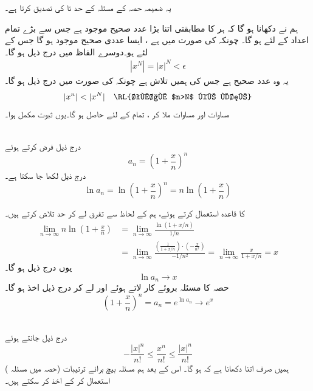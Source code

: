 یہ ضمیمہ  حصہ   کے مسئلہ    کے حد   تا  کی تصدیق کرتا ہے۔

\quad {}\quad 
ہم نے دکھانا ہو گا کہ   ہر  کا   مطابقتی    اتنا بڑا عدد صحیح  موجود ہے  جس سے بڑے تمام  اعداد  کے لئے  ہو گا۔ چونکہ   کی صورت میں  ہے ، ایسا عددی صحیح موجود ہو گا جس کے لئے  ہو۔دوسرے الفاظ میں درج ذیل ہو گا۔
\begin{align}\label{مساوات_ضمیمہ_ج_ایک}
|x^N|=|x|^N<\epsilon
\end{align}
یہ وہ عدد صحیح ہے جس کی ہمیں تلاش ہے چونکہ  کی صورت میں درج ذیل ہو گا۔
\begin{align}\label{مساوات_ضمیمہ_ج_دو}
|x^n|<|x^N|\quad \text{\RL{تمام $n>N$ کے لئے}}
\end{align}
مساوات  اور مساوات  ملا کر ، تمام  کے 
لئے    حاصل ہو گا۔یوں ثبوت مکمل ہوا۔

 \quad
  \\
 درج ذیل فرض کرتے ہوئے
\[a_n=\left(1+\frac{x}{n}\right)^n\]
درج ذیل لکھا جا سکتا ہے۔
\[\ln a_n=\ln \left(1+\frac{x}{n}\right)^n=n\ln\left(1+\frac{x}{n}\right)\]

  کا قاعدہ  استعمال کرتے ہوئے،  ہم  کے لحاظ سے تفرق لے کر حد تلاش کرتے ہیں۔
\begin{align*}
\lim_{n\to\infty} n\ln \left(1+\frac{x}{n}\right) &=\lim_{n\to\infty}\frac{\ln (1+x\!/\!n)}{1\!/\!n}\\
&=\lim_{n\to\infty}\frac{\left(\frac{1}{1+x\!/\!n}\right)\cdot\left(-\frac{x}{n^2}\right)}{-1\!/\!n^2}=\lim_{n\to\infty}\frac{x}{1+x\!/\!n}=x
\end{align*}
یوں درج ذیل ہو گا۔
\[\ln a_n\to x\]
حصہ  کا مسئلہ  بروئے کار لاتے ہوئے اور  لے کر درج ذیل اخذ ہو گا۔
\[\left(1+\frac{x}{n}\right)^n=a_n=e^{\ln a_n}\to e^x\]

\\
درج ذیل جانتے ہوئے
\[-\frac{|x|^n}{n!}\le \frac{x^n}{n!}\le \frac{|x|^n}{n!}\]
ہمیں صرف اتنا دکھانا ہے کہ  ہو گا۔ اس کے بعد ہم   مسئلہ بیچ برائے  ترتیبات    (حصہ  میں    مسئلہ  )  استعمال کر کے   اخذ کر سکتے ہیں۔

